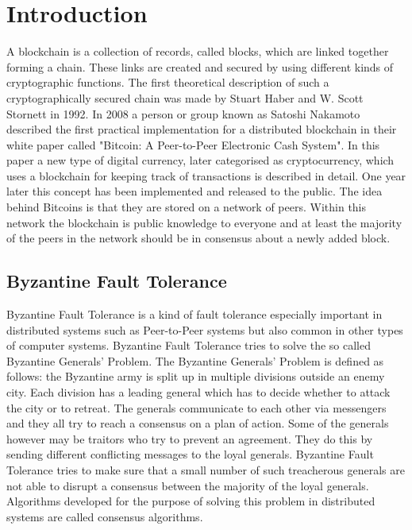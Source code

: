 \section{Introduction}

A blockchain is a collection of records, called blocks, which are linked together forming a chain. These links are created and secured by using different kinds of cryptographic functions.
The first theoretical description of such a cryptographically secured chain was made by Stuart Haber and W. Scott Stornett in 1992.\cite{book:haber} In 2008 a person or group known as Satoshi Nakamoto
described the first practical implementation for a distributed blockchain in their white paper called "Bitcoin: A Peer-to-Peer Electronic Cash System".\cite{url:bitcoin} In this paper a new type of digital
currency, later categorised as cryptocurrency, which uses a blockchain for keeping track of transactions is described in detail. One year later this concept has been implemented and released to the
public. The idea behind Bitcoins is that they are stored on a network of peers. Within this network the blockchain is public knowledge to everyone and at least the majority of the peers in the
network should be in consensus about a newly added block.

\subsection{Byzantine Fault Tolerance}

Byzantine Fault Tolerance is a kind of fault tolerance especially important in distributed systems such as Peer-to-Peer systems but also common in other types of computer systems.
Byzantine Fault Tolerance tries to solve the so called Byzantine Generals' Problem. The Byzantine Generals' Problem is defined as follows: the Byzantine army is split up in multiple divisions 
outside an enemy city. Each division has a leading general which has to decide whether to attack the city or to retreat. The generals communicate to each other via messengers and they all try to
reach a consensus on a plan of action. Some of the generals however may be traitors who try to prevent an agreement. They do this by sending different conflicting messages to the loyal generals. 
Byzantine Fault Tolerance tries to make sure that a small number of such treacherous generals are not able to disrupt a consensus between the majority of the loyal generals.\cite{url:byzantine_general}
Algorithms developed for the purpose of solving this problem in distributed systems are called consensus algorithms.

